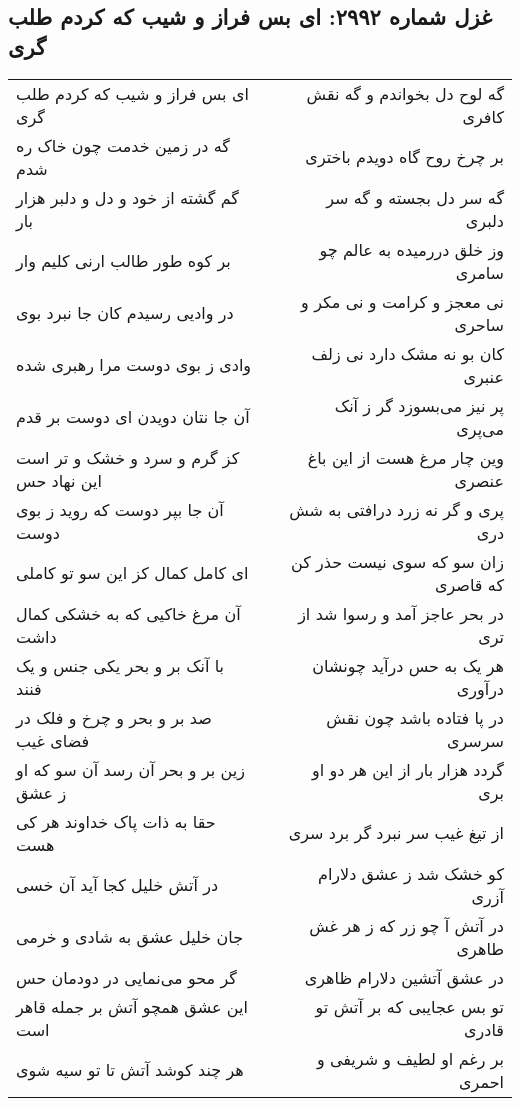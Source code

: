 \begin{center}
\section*{غزل شماره ۲۹۹۲: ای بس فراز و شیب که کردم طلب گری}
\label{sec:2992}
\begin{longtable}{l p{0.5cm} r}
ای بس فراز و شیب که کردم طلب گری
&&
گه لوح دل بخواندم و گه نقش کافری
\\
گه در زمین خدمت چون خاک ره شدم
&&
بر چرخ روح گاه دویدم باختری
\\
گم گشته از خود و دل و دلبر هزار بار
&&
گه سر دل بجسته و گه سر دلبری
\\
بر کوه طور طالب ارنی کلیم وار
&&
وز خلق دررمیده به عالم چو سامری
\\
در وادیی رسیدم کان جا نبرد بوی
&&
نی معجز و کرامت و نی مکر و ساحری
\\
وادی ز بوی دوست مرا رهبری شده
&&
کان بو نه مشک دارد نی زلف عنبری
\\
آن جا نتان دویدن ای دوست بر قدم
&&
پر نیز می‌بسوزد گر ز آنک می‌پری
\\
کز گرم و سرد و خشک و تر است این نهاد حس
&&
وین چار مرغ هست از این باغ عنصری
\\
آن جا بپر دوست که روید ز بوی دوست
&&
پری و گر نه زرد درافتی به شش دری
\\
ای کامل کمال کز این سو تو کاملی
&&
زان سو که سوی نیست حذر کن که قاصری
\\
آن مرغ خاکیی که به خشکی کمال داشت
&&
در بحر عاجز آمد و رسوا شد از تری
\\
با آنک بر و بحر یکی جنس و یک فنند
&&
هر یک به حس درآید چونشان درآوری
\\
صد بر و بحر و چرخ و فلک در فضای غیب
&&
در پا فتاده باشد چون نقش سرسری
\\
زین بر و بحر آن رسد آن سو که او ز عشق
&&
گردد هزار بار از این هر دو او بری
\\
حقا به ذات پاک خداوند هر کی هست
&&
از تیغ غیب سر نبرد گر برد سری
\\
در آتش خلیل کجا آید آن خسی
&&
کو خشک شد ز عشق دلارام آزری
\\
جان خلیل عشق به شادی و خرمی
&&
در آتش آ چو زر که ز هر غش طاهری
\\
گر محو می‌نمایی در دودمان حس
&&
در عشق آتشین دلارام ظاهری
\\
این عشق همچو آتش بر جمله قاهر است
&&
تو بس عجایبی که بر آتش تو قادری
\\
هر چند کوشد آتش تا تو سیه شوی
&&
بر رغم او لطیف و شریفی و احمری
\\

\end{longtable}
\end{center}
